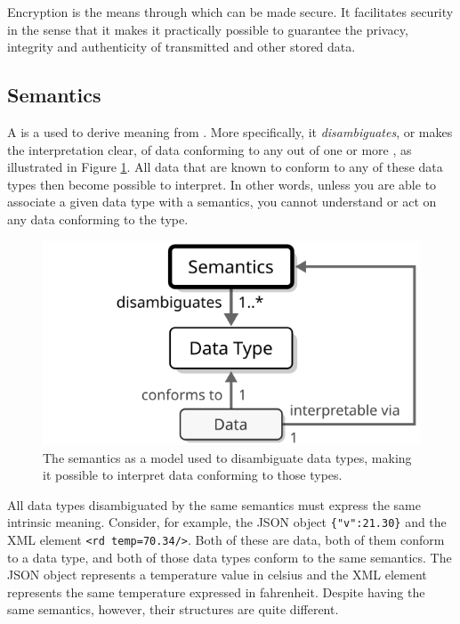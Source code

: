 Encryption is the means through which  can be made secure.
It facilitates security in the sense that it makes it practically possible to guarantee the privacy, integrity and authenticity of transmitted  and other stored data.

\newpage

\subsection{Semantics}
\label{sec:concepts:semantics}

A  is a  used to derive meaning from .
More specifically, it \textit{disambiguates}, or makes the interpretation clear, of data conforming to any out of one or more , as illustrated in Figure \ref{fig:semantics}.
All data that are known to conform to any of these data types then become possible to interpret.
In other words, unless you are able to associate a given data type with a semantics, you cannot understand or act on any data conforming to the type.

\begin{figure}[ht!]
  \centering
  \includegraphics[scale=0.9]{figures/semantics}
  \caption{
    The semantics as a model used to disambiguate data types, making it possible to interpret data conforming to those types.
  }
  \label{fig:semantics}
\end{figure}

All data types disambiguated by the same semantics must express the same intrinsic meaning.
Consider, for example, the JSON \cite{rfc7159} object \texttt{\{"v":21.30\}} and the XML \cite{w3c2008xml} element \texttt{<rd temp=70.34/>}.
Both of these are data, both of them conform to a data type, and both of those data types conform to the same semantics.
The JSON object represents a temperature value in celsius and the XML element represents the same temperature expressed in fahrenheit.
Despite having the same semantics, however, their structures are quite different.

